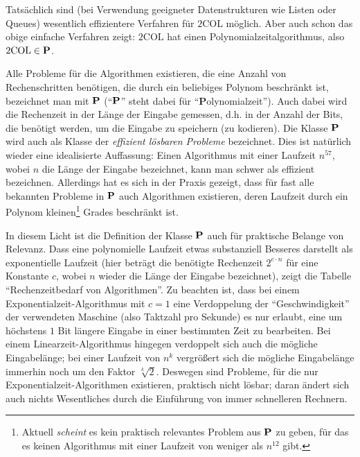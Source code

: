Tatsächlich sind (bei Verwendung geeigneter Datenstrukturen wie Listen
oder Queues) wesentlich effizientere Verfahren für $2\mathrm{COL}$ möglich.
Aber auch schon das obige einfache Verfahren zeigt: $2\mathrm{COL}$ hat einen
Polynomialzeitalgorithmus, also $2\mathrm{COL} \in\P$.

Alle Probleme für die Algorithmen existieren, die eine Anzahl von
Rechenschritten benötigen, die durch ein beliebiges Polynom beschränkt
ist, bezeichnet man mit $\P$ ("`$\P$"' steht dabei für
"`\textbf{P}olyno\-mi\-al\-zeit"'). Auch dabei wird die Rechenzeit in
der Länge der Eingabe gemessen, d.h. in der Anzahl der Bits, die
benötigt werden, um die Eingabe zu speichern (zu kodieren). Die Klasse
$\P$ wird auch als Klasse der \emph{effizient lösbaren
Probleme} bezeichnet. Dies ist natürlich wieder eine idealisierte
Auffassung: Einen Algorithmus mit einer Laufzeit $n^{57}$, wobei $n$
die Länge der Eingabe bezeichnet, kann man schwer als effizient
bezeichnen. Allerdings hat es sich in der Praxis gezeigt, dass für
fast alle bekannten Probleme in $\P$ auch Algorithmen existieren,
deren Laufzeit durch ein Polynom
kleinen\footnote{Aktuell \emph{scheint} es kein praktisch relevantes
Problem aus $\P$ zu geben, für das es keinen Algorithmus mit einer
Laufzeit von weniger als $n^{12}$ gibt.} Grades beschränkt ist.

In diesem Licht ist die Definition der Klasse $\P$ auch für praktische
Belange von Relevanz. Dass eine polynomielle Laufzeit etwas
substanziell Besseres darstellt als exponentielle Laufzeit (hier
beträgt die benötigte Rechenzeit $2^{c \cdot n}$ für eine Konstante
$c$, wobei $n$ wieder die Länge der Eingabe bezeichnet), zeigt die
Tabelle "`Rechenzeitbedarf von Algorithmen"'. Zu beachten ist, dass
bei einem Exponentialzeit-Algorithmus mit $c=1$ eine Verdoppelung der
"`Geschwindigkeit"' der verwendeten Maschine (also Taktzahl pro
Sekunde) es nur erlaubt, eine um höchstens $1$ Bit längere Eingabe in
einer bestimmten Zeit zu bearbeiten. Bei einem Linearzeit-Algorithmus
hingegen verdoppelt sich auch die mögliche Eingabelänge; bei einer
Laufzeit von $n^k$ vergrößert sich die mögliche Eingabelänge immerhin
noch um den Faktor $\sqrt[k]{2}$. Deswegen sind Probleme, für die nur
Exponentialzeit-Algorithmen existieren, praktisch nicht lösbar; daran
ändert sich auch nichts Wesentliches durch die Einführung von immer
schnelleren Rechnern.

